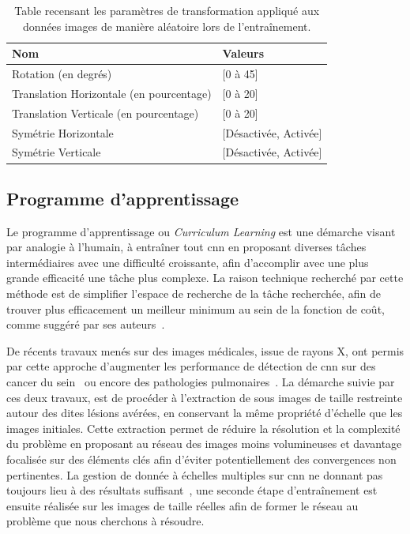 \begin{table}[H]
    \centering
    \begin{tabular}{ll}
        \toprule
        \textbf{Nom}                            & \textbf{Valeurs}      \\ \midrule
        Rotation (en degrés)                    & [0 à 45]              \\ 
        Translation Horizontale (en pourcentage)& [0 à 20]              \\ 
        Translation Verticale (en pourcentage)  & [0 à 20]              \\  
        Symétrie Horizontale                    & [Désactivée, Activée]  \\  
        Symétrie Verticale                      & [Désactivée, Activée]  \\ 
        \bottomrule 
    \end{tabular} 
    \caption{Table recensant les paramètres de transformation appliqué aux données images de manière aléatoire lors de l'entraînement.}
    \label{tab:parameters_image_improvement_data_augmentation}
\end{table}\par

\subsection{Programme d'apprentissage}
Le programme d'apprentissage ou \textit{Curriculum Learning} est une démarche visant par analogie à l'humain, à entraîner tout \gls{cnn} en proposant diverses tâches intermédiaires avec une difficulté croissante, afin d'accomplir avec une plus grande efficacité une tâche plus complexe. La raison technique recherché par cette méthode est de simplifier l'espace de recherche de la tâche recherchée, afin de trouver plus efficacement un meilleur minimum au sein de la fonction de coût, comme suggéré par ses auteurs~\cite{Bengio2009}.\par

De récents travaux menés sur des images médicales, issue de rayons X, ont permis par cette approche d'augmenter les performance de détection de \gls{cnn} sur des cancer du sein~\cite{Lotter2017} ou encore des pathologies pulmonaires~\cite{Park2019}. La démarche suivie par ces deux travaux, est de procéder à l'extraction de sous images de taille restreinte autour des dites lésions avérées, en conservant la même propriété d'échelle que les images initiales. Cette extraction permet de réduire la résolution et la complexité du problème en proposant au réseau des images moins volumineuses et davantage focalisée sur des éléments clés afin d'éviter potentiellement des convergences non pertinentes. La gestion de donnée à échelles multiples sur \gls{cnn} ne donnant pas toujours lieu à des résultats suffisant~\cite{Noord2017}, une seconde étape d'entraînement est ensuite réalisée sur les images de taille réelles afin de former le réseau au problème que nous cherchons à résoudre.\par

